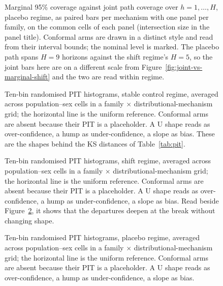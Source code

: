 \begin{figure}[htbp]\centering
{}
\caption{Marginal 95\% coverage against joint path coverage over
$h=1,\dots,H$, placebo regime, as paired bars per mechanism with one panel per
family, on the common cells of each panel (intersection size in the panel
title). Conformal arms are drawn in a distinct style and read from their
interval bounds; the nominal level is marked. The placebo path spans $H=9$
horizons against the shift regime's $H=5$, so the joint bars here are on a
different scale from Figure~\ref{fig:joint-vs-marginal-shift} and the two are
read within regime.}
\label{fig:joint-vs-marginal-placebo}
\end{figure}
\clearpage

\begin{figure}[htbp]\centering
{}
\caption{Ten-bin randomised PIT histograms, stable control regime, averaged
across population--sex cells in a family $\times$ distributional-mechanism
grid; the horizontal line is the uniform reference. Conformal arms are absent
because their PIT is a placeholder. A U shape reads as over-confidence, a hump
as under-confidence, a slope as bias. These are the shapes behind the KS
distances of Table~\ref{tab:pit}.}
\label{fig:pit-hist-stable}
\end{figure}
\clearpage

\begin{figure}[htbp]\centering
{}
\caption{Ten-bin randomised PIT histograms, shift regime, averaged across
population--sex cells in a family $\times$ distributional-mechanism grid; the
horizontal line is the uniform reference. Conformal arms are absent because
their PIT is a placeholder. A U shape reads as over-confidence, a hump as
under-confidence, a slope as bias. Read beside
Figure~\ref{fig:pit-hist-stable}, it shows that the departures deepen at the
break without changing shape.}
\label{fig:pit-hist-shift}
\end{figure}
\clearpage

\begin{figure}[htbp]\centering
{}
\caption{Ten-bin randomised PIT histograms, placebo regime, averaged across
population--sex cells in a family $\times$ distributional-mechanism grid; the
horizontal line is the uniform reference. Conformal arms are absent because
their PIT is a placeholder. A U shape reads as over-confidence, a hump as
under-confidence, a slope as bias.}
\label{fig:pit-hist-placebo}
\end{figure}
\clearpage
